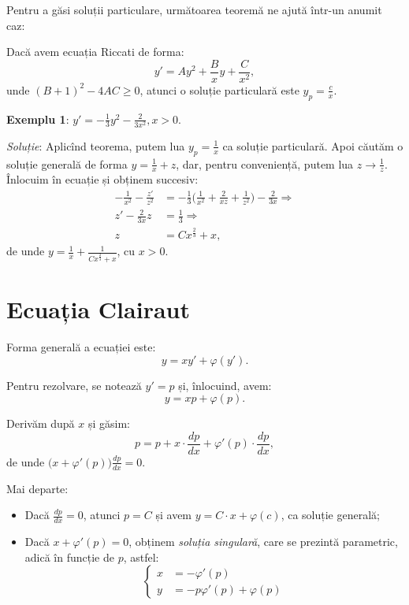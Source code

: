 Pentru a găsi soluții particulare, următoarea teoremă ne ajută într-un anumit caz:

\begin{theorem}\label{thm:ric}
  Dacă avem ecuația Riccati de forma:
  \[
    y' = Ay^2 + \frac{B}{x}y + \frac{C}{x^2},
  \]
  unde $(B + 1)^2 - 4AC \geq 0$, atunci o soluție particulară este $y_p = \frac{c}{x}$.
\end{theorem}

\textbf{Exemplu 1}: $y' = -\frac{1}{3} y^2 - \frac{2}{3x^2}, x > 0$.

\emph{Soluție}: Aplicînd teorema, putem lua $y_p = \frac{1}{x}$ ca soluție particulară.
Apoi căutăm o soluție generală de forma $y = \frac{1}{x} + z$, dar, pentru conveniență,
putem lua $z \to \frac{1}{z}$. Înlocuim în ecuație și obținem succesiv:
\begin{align*}
  -\frac{1}{x^2} - \frac{z'}{z^2} &= -\frac{1}{3} \Big( \frac{1}{x^2} + \frac{2}{xz} + \frac{1}{z^2} \Big) - \frac{2}{3x} \Rightarrow \\
  z' - \frac{2}{3x} z &= \frac{1}{3} \Rightarrow \\
  z &= Cx^{\frac{2}{3}} + x,
\end{align*}
de unde $y = \frac{1}{x} + \frac{1}{Cx^{\frac{2}{3}} + x}$, cu $x > 0$.


\section{Ecuația Clairaut}
\label{sec:clairaut}

Forma generală a ecuației este:
\[
  y = xy' + \varphi(y').
\]

Pentru rezolvare, se notează $y' = p$ și, înlocuind, avem:
\[
  y = xp + \varphi(p).
\]

Derivăm după $x$ și găsim:
\[
  p = p + x \cdot \frac{dp}{dx} + \varphi'(p) \cdot \frac{dp}{dx},
\]
de unde $\big( x + \varphi'(p) \big) \frac{dp}{dx} = 0$.

Mai departe:
\begin{itemize}
\item Dacă $\frac{dp}{dx} = 0$, atunci $p = C$ și avem $y = C \cdot x + \varphi(c)$, ca soluție generală;
\item Dacă $x + \varphi'(p) = 0$, obținem \emph{soluția singulară}, care se prezintă parametric, adică
  în funcție de $p$, astfel:
  \[
    \begin{cases}
      x &= -\varphi'(p) \\
      y &= -p\varphi'(p) + \varphi(p)
    \end{cases}
  \]
\end{itemize}

